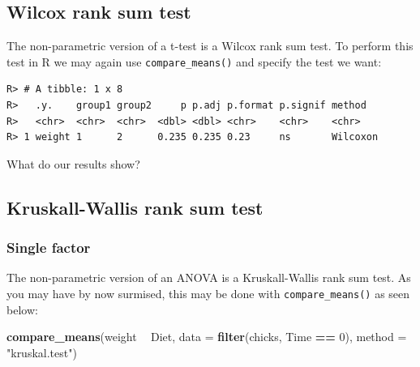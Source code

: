 \documentclass[english,10pt,a4paper,oneside]{book}
\newenvironment{Shaded}{\begin{snugshade}}{\end{snugshade}}
\newcommand{\DataTypeTok}[1]{\textcolor[rgb]{0.13,0.29,0.53}{#1}}
\newcommand{\DecValTok}[1]{\textcolor[rgb]{0.00,0.00,0.81}{#1}}
\newcommand{\KeywordTok}[1]{\textcolor[rgb]{0.13,0.29,0.53}{\textbf{#1}}}
\newcommand{\NormalTok}[1]{#1}
\newcommand{\OperatorTok}[1]{\textcolor[rgb]{0.81,0.36,0.00}{\textbf{#1}}}
\newcommand{\StringTok}[1]{\textcolor[rgb]{0.31,0.60,0.02}{#1}}
\theoremstyle{definition}
\theoremstyle{definition}
\theoremstyle{definition}
\theoremstyle{remark}
\begin{document}
\hypertarget{wilcox-rank-sum-test}{%
\subsection{Wilcox rank sum test}\label{wilcox-rank-sum-test}}

The non-parametric version of a t-test is a Wilcox rank sum test. To
perform this test in R we may again use \texttt{compare\_means()} and
specify the test we want:

\begin{Shaded}
\end{Shaded}

\begin{verbatim}
R> # A tibble: 1 x 8
R>   .y.    group1 group2     p p.adj p.format p.signif method  
R>   <chr>  <chr>  <chr>  <dbl> <dbl> <chr>    <chr>    <chr>   
R> 1 weight 1      2      0.235 0.235 0.23     ns       Wilcoxon
\end{verbatim}

What do our results show?

\hypertarget{kruskall-wallis-rank-sum-test}{%
\subsection{Kruskall-Wallis rank sum
test}\label{kruskall-wallis-rank-sum-test}}

\hypertarget{single-factor-1}{%
\subsubsection{Single factor}\label{single-factor-1}}

The non-parametric version of an ANOVA is a Kruskall-Wallis rank sum
test. As you may have by now surmised, this may be done with
\texttt{compare\_means()} as seen below:

\begin{Shaded}
\begin{Highlighting}[]
\KeywordTok{compare_means}\NormalTok{(weight }\OperatorTok{~}\StringTok{ }\NormalTok{Diet, }\DataTypeTok{data =} \KeywordTok{filter}\NormalTok{(chicks, Time }\OperatorTok{==}\StringTok{ }\DecValTok{0}\NormalTok{), }\DataTypeTok{method =} \StringTok{"kruskal.test"}\NormalTok{)}
\end{Highlighting}
\end{Shaded}
\end{document}
